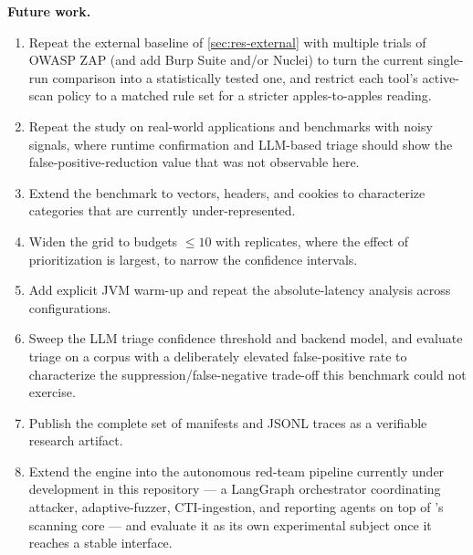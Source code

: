 \noindent\textbf{Future work.}
\begin{enumerate}
  \item Repeat the external baseline of \cref{sec:res-external} with
  multiple trials of OWASP ZAP (and add Burp Suite and/or Nuclei) to turn the
  current single-run comparison into a statistically tested one, and restrict
  each tool's active-scan policy to a matched rule set for a stricter
  apples-to-apples reading.
  \item Repeat the study on real-world applications and benchmarks with noisy
  signals, where runtime confirmation and LLM-based triage should show the
  false-positive-reduction value that was not observable here.
  \item Extend the benchmark to  vectors, headers, and cookies to
  characterize categories that are currently under-represented.
  \item Widen the grid to budgets $\le \num{10}$ with replicates, where the
  effect of prioritization is largest, to narrow the confidence intervals.
  \item Add explicit JVM warm-up and repeat the absolute-latency analysis
  across configurations.
  \item Sweep the LLM triage confidence threshold and backend model, and
  evaluate triage on a corpus with a deliberately elevated false-positive
  rate to characterize the suppression/false-negative trade-off this
  benchmark could not exercise.
  \item Publish the complete set of manifests and JSONL traces as a
  verifiable research artifact.
  \item Extend the engine into the autonomous red-team pipeline currently
  under development in this repository --- a LangGraph orchestrator
  coordinating attacker, adaptive-fuzzer, CTI-ingestion, and reporting agents
  on top of \herramienta's scanning core --- and evaluate it as its own
  experimental subject once it reaches a stable interface.
\end{enumerate}
